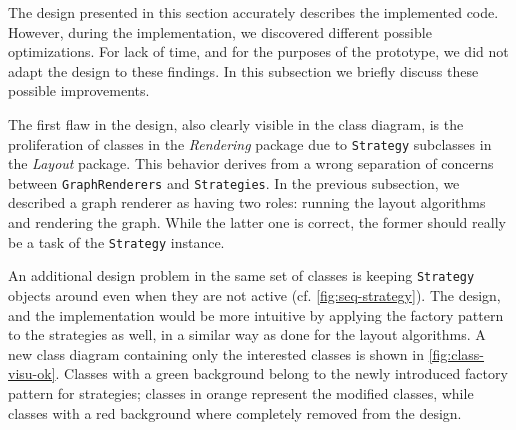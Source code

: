 The design presented in this section accurately describes the implemented code. However, during the implementation, we discovered different possible optimizations. For lack of time, and for the purposes of the prototype, we did not adapt the design to these findings. In this subsection we briefly discuss these possible improvements.

The first flaw in the design, also clearly visible in the class diagram, is the proliferation of classes in the \emph{Rendering} package due to \texttt{Strategy} subclasses in the \emph{Layout} package. This behavior derives from a wrong separation of concerns between \texttt{GraphRenderers} and \texttt{Strategies}. In the previous subsection, we described a graph renderer as having two roles: running the layout algorithms and rendering the graph. While the latter one is correct, the former should really be a task of the \texttt{Strategy} instance.

An additional design problem in the same set of classes is keeping \texttt{Strategy} objects around even when they are not active (cf. \vref{fig:seq-strategy}). The design, and the implementation would be more intuitive by applying the factory pattern to the strategies as well, in a similar way as done for the layout algorithms. A new class diagram containing only the interested classes is shown in \vref{fig:class-visu-ok}. Classes with a green background belong to the newly introduced factory pattern for strategies; classes in orange represent the modified classes, while classes with a red background where completely removed from the design.

